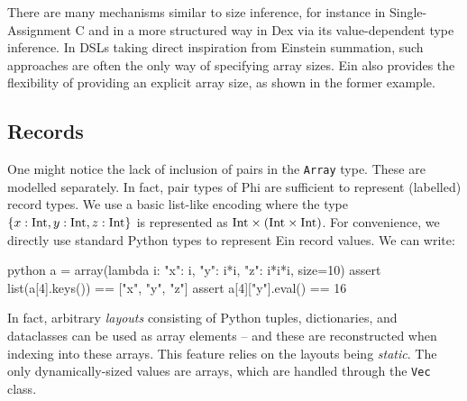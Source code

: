 There are many mechanisms similar to size inference, for instance in Single-Assignment C and in a more structured way in Dex via its value-dependent type inference. In DSLs taking direct inspiration from Einstein summation, such approaches are often the only way of specifying array sizes. Ein also provides the flexibility of providing an explicit array size, as shown in the former example.

\subsection{Records}

One might notice the lack of inclusion of pairs in the \texttt{Array} type. These are modelled separately. In fact, pair types of Phi are sufficient to represent (labelled) record types. We use a basic list-like encoding where the type $\{ x: \mathrm{Int}, y: \mathrm{Int}, z: \mathrm{Int} \}$ is represented as $\phipairtype{\phiinttype}{\left( \phiinttype \times \phiinttype \right)}$. For convenience, we directly use standard Python types to represent Ein record values. We can write:
\begin{center} 
\begin{cminted}{python}
a = array(lambda i: {"x": i, "y": i*i, "z": i*i*i}, size=10)
assert list(a[4].keys()) == ["x", "y", "z"]
assert a[4]["y"].eval() == 16
\end{cminted}
\end{center}
In fact, arbitrary \textit{layouts} consisting of Python tuples, dictionaries, and dataclasses can be used as array elements -- and these are reconstructed when indexing into these arrays. This feature relies on the layouts being \textit{static}. The only dynamically-sized values are arrays, which are handled through the \texttt{Vec} class. 

